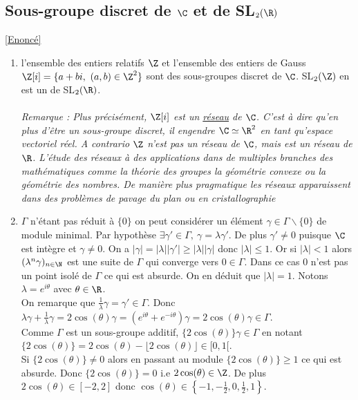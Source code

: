 \documentclass[8pt]{book}
\begin{document}
	\subsection{Sous-groupe discret de $\C$ et de SL$_2(\R)$ }
	\label{Sous-groupe discret de C et de SL2(R) corrigé}
	\textcolor{blue}{\hyperref[Sous-groupe discret de C et de SL2(R)]{[Enoncé]}}\\
	\begin{enumerate}[leftmargin=*]
		\item l'ensemble des entiers relatifs $\Z$ et l'ensemble des entiers de Gauss $\Z[i]=\{a+bi,\ (a,b)\in \Z^2\}$ sont des sous-groupes discret de $\C$. SL$_2(\Z)$ en est un de SL$_2(\R)$.\\\\
		\textit{Remarque : Plus précisément, $\Z[i]$ est un \underline{réseau} de $\C$. C'est à dire qu'en plus d'être un sous-groupe discret, il engendre $\C\simeq\R^2$ en tant qu'espace vectoriel réel. A contrario $\Z$ n'est pas un réseau de $\C$, mais est un réseau de $\R$. L'étude des réseaux à des applications dans de multiples branches des mathématiques comme la théorie des groupes la géométrie convexe ou la géométrie des nombres. De manière plus pragmatique les réseaux apparaissent dans des problèmes de pavage du plan ou en cristallographie}
		\item $\Gamma$ n'étant pas réduit à $\{0\}$ on peut considérer un élément $\gamma\in \Gamma\backslash\{0\}$ de module minimal. Par hypothèse $\exists \gamma'\in \Gamma,\ \gamma=\lambda\gamma'$. De plus $\gamma'\ne 0$ puisque $\C$ est intègre et $\gamma\ne 0$. On a $|\gamma|=|\lambda||\gamma'|\geq |\lambda||\gamma|$ donc $|\lambda|\leq 1$. Or si $|\lambda|<1$ alors $(\lambda^n\gamma)_{n\in \N}$ est une suite de $\Gamma$ qui converge vers $0\in \Gamma$. Dans ce cas $0$ n'est pas un point isolé de $\Gamma$ ce qui est absurde. On en déduit que $|\lambda|=1$. Notons $\lambda=e^{i\theta}$ avec $\theta\in \R$.\\
		On remarque que $\displaystyle\frac{1}{\lambda}\gamma=\gamma'\in \Gamma$. Donc $\lambda\gamma+\displaystyle\frac{1}{\lambda}\gamma=2\cos(\theta)\gamma=(e^{i\theta}+e^{-i\theta})\gamma=2\cos(\theta)\gamma\in \Gamma$.\\
		Comme $\Gamma$ est un sous-groupe additif, $\{2\cos(\theta)\}\gamma\in \Gamma$ en notant $\{2\cos(\theta)\}=2\cos(\theta)-\lfloor2\cos(\theta)\rfloor\in [0,1[$.\\
		Si $\{2\cos(\theta)\}\ne 0$ alors en passant au module $\{2\cos(\theta)\}\geq 1$ ce qui est absurde. Donc $\{2\cos(\theta)\}=0$ i.e $2\cos(\theta)\in \Z$. De plus $2\cos(\theta)\in [-2,2]$ donc $\cos(\theta)\in \displaystyle\left\{-1,-\frac{1}{2},0,\frac{1}{2},1\right\}$.\\

\end{enumerate}
\end{document}

